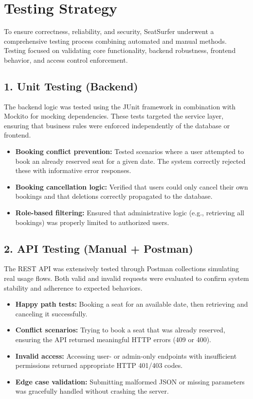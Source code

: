 \documentclass[12pt,a4paper]{report}
\begin{document}
\section{Testing Strategy}

To ensure correctness, reliability, and security, SeatSurfer underwent a comprehensive testing process combining automated and manual methods. Testing focused on validating core functionality, backend robustness, frontend behavior, and access control enforcement.

\subsection*{1. Unit Testing (Backend)}

The backend logic was tested using the JUnit framework in combination with Mockito for mocking dependencies. These tests targeted the service layer, ensuring that business rules were enforced independently of the database or frontend.

\begin{itemize}
    \item \textbf{Booking conflict prevention:} Tested scenarios where a user attempted to book an already reserved seat for a given date. The system correctly rejected these with informative error responses.
    \item \textbf{Booking cancellation logic:} Verified that users could only cancel their own bookings and that deletions correctly propagated to the database.
    \item \textbf{Role-based filtering:} Ensured that administrative logic (e.g., retrieving all bookings) was properly limited to authorized users.
\end{itemize}

\subsection*{2. API Testing (Manual + Postman)}

The REST API was extensively tested through Postman collections simulating real usage flows. Both valid and invalid requests were evaluated to confirm system stability and adherence to expected behaviors.

\begin{itemize}
    \item \textbf{Happy path tests:} Booking a seat for an available date, then retrieving and canceling it successfully.
    \item \textbf{Conflict scenarios:} Trying to book a seat that was already reserved, ensuring the API returned meaningful HTTP errors (409 or 400).
    \item \textbf{Invalid access:} Accessing user- or admin-only endpoints with insufficient permissions returned appropriate HTTP 401/403 codes.
    \item \textbf{Edge case validation:} Submitting malformed JSON or missing parameters was gracefully handled without crashing the server.
\end{itemize}
\end{document}
